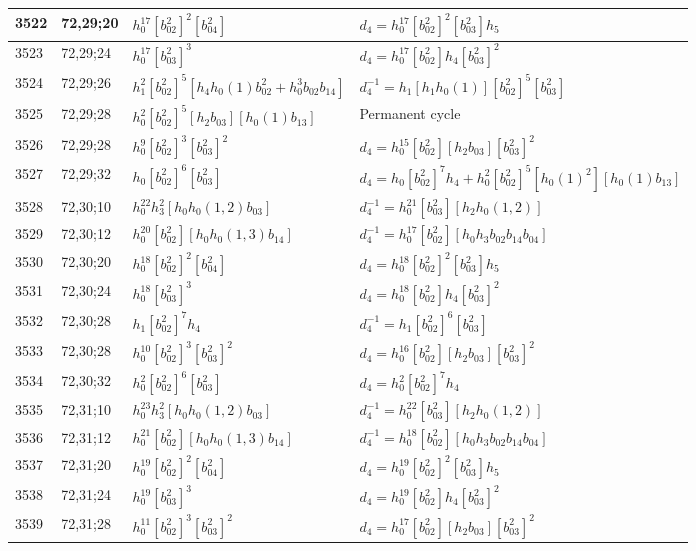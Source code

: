 \documentclass{article}
\begin{document}
\begin{longtable}{|l|l|>{\raggedright\arraybackslash}p{6cm}|>{\raggedright\arraybackslash}p{6cm}|}
\hline
3522 & 72,29;20 & $h_0^{17}[b_{02}^2]^2[b_{04}^2]$ &$d_{4}=h_0^{17}[b_{02}^2]^2[b_{03}^2]h_5$\\
\hline
3523 & 72,29;24 & $h_0^{17}[b_{03}^2]^3$ &$d_{4}=h_0^{17}[b_{02}^2]h_4[b_{03}^2]^2$\\
\hline
3524 & 72,29;26 & $h_1^2[b_{02}^2]^5[h_4h_0(1)b_{02}^2 + h_0^3b_{02}b_{14}]$ & $d_{4}^{-1}=h_1[h_1h_0(1)][b_{02}^2]^5[b_{03}^2]$\\
\hline
3525 & 72,29;28 & $h_0^2[b_{02}^2]^5[h_2b_{03}][h_0(1)b_{13}]$ & Permanent cycle\\
3526 & 72,29;28 & $h_0^9[b_{02}^2]^3[b_{03}^2]^2$ &$d_{4}=h_0^{15}[b_{02}^2][h_2b_{03}][b_{03}^2]^2$\\
\hline
3527 & 72,29;32 & $h_0[b_{02}^2]^6[b_{03}^2]$ &$d_{4}=h_0[b_{02}^2]^7h_4 + h_0^2[b_{02}^2]^5[h_0(1)^2][h_0(1)b_{13}]$\\
\hline
3528 & 72,30;10 & $h_0^{22}h_3^2[h_0h_0(1, 2)b_{03}]$ & $d_{4}^{-1}=h_0^{21}[b_{03}^2][h_2h_0(1, 2)]$\\
\hline
3529 & 72,30;12 & $h_0^{20}[b_{02}^2][h_0h_0(1, 3)b_{14}]$ & $d_{4}^{-1}=h_0^{17}[b_{02}^2][h_0h_3b_{02}b_{14}b_{04}]$\\
\hline
3530 & 72,30;20 & $h_0^{18}[b_{02}^2]^2[b_{04}^2]$ &$d_{4}=h_0^{18}[b_{02}^2]^2[b_{03}^2]h_5$\\
\hline
3531 & 72,30;24 & $h_0^{18}[b_{03}^2]^3$ &$d_{4}=h_0^{18}[b_{02}^2]h_4[b_{03}^2]^2$\\
\hline
3532 & 72,30;28 & $h_1[b_{02}^2]^7h_4$ & $d_{4}^{-1}=h_1[b_{02}^2]^6[b_{03}^2]$\\
3533 & 72,30;28 & $h_0^{10}[b_{02}^2]^3[b_{03}^2]^2$ &$d_{4}=h_0^{16}[b_{02}^2][h_2b_{03}][b_{03}^2]^2$\\
\hline
3534 & 72,30;32 & $h_0^2[b_{02}^2]^6[b_{03}^2]$ &$d_{4}=h_0^2[b_{02}^2]^7h_4$\\
\hline
3535 & 72,31;10 & $h_0^{23}h_3^2[h_0h_0(1, 2)b_{03}]$ & $d_{4}^{-1}=h_0^{22}[b_{03}^2][h_2h_0(1, 2)]$\\
\hline
3536 & 72,31;12 & $h_0^{21}[b_{02}^2][h_0h_0(1, 3)b_{14}]$ & $d_{4}^{-1}=h_0^{18}[b_{02}^2][h_0h_3b_{02}b_{14}b_{04}]$\\
\hline
3537 & 72,31;20 & $h_0^{19}[b_{02}^2]^2[b_{04}^2]$ &$d_{4}=h_0^{19}[b_{02}^2]^2[b_{03}^2]h_5$\\
\hline
3538 & 72,31;24 & $h_0^{19}[b_{03}^2]^3$ &$d_{4}=h_0^{19}[b_{02}^2]h_4[b_{03}^2]^2$\\
\hline
3539 & 72,31;28 & $h_0^{11}[b_{02}^2]^3[b_{03}^2]^2$ &$d_{4}=h_0^{17}[b_{02}^2][h_2b_{03}][b_{03}^2]^2$\\

\end{longtable}
\end{document}
